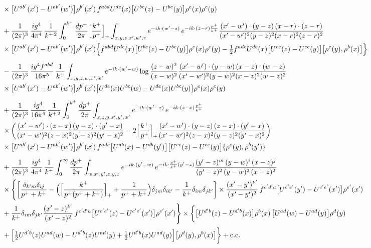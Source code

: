 \documentclass[9pt]{article}
\numberwithin{equation}{section}
\begin{document}
\begin{align}
&\times\big[U^{ab'}(x')-U^{ab'}(w')\big]\rho^{b'}(x')\,f^{abd}U^{de}(x)\big[U^{bc}(z)-U^{bc}(y)\big]\rho^{e}(x)\rho^{c}(y)\notag\\[6pt]
&+\frac{1}{(2\pi)^{3}}\,\frac{ig^{4}}{4\pi^{4}}\,\frac{1}{k^{+\,2}}\int_{0}^{k^{+}}\frac{dp^{+}}{2\pi}\Big[\frac{k^{+}}{p^{+}}\Big]_{+}\int_{x,y,z,x',w',r}e^{-ik\cdot(w'-z)}\,e^{-ik\cdot(z-r)\frac{p^{+}}{k^{+}}}\frac{(x'-w')\cdot(y-z)\,(x-r)\cdot(z-r)}{(x'-w')^{2}(y-z)^{2}(x-r)^{2}(z-r)^{2}}\notag\\
&\times\big[U^{ab'}(x')-U^{ab'}(w')\big]\rho^{b'}(x')\Big\{f^{abd}U^{de}(x)\big[U^{bc}(z)-U^{bc}(y)\big]\rho^{e}(x)\rho^{c}(y)-\tfrac12f^{adc}U^{db}(x)\big[U^{ce}(z)-U^{ce}(y)\big]\big[\rho^{e}(y),\rho^{b}(x)\big]\Big\}\notag\\[6pt]
&-\frac{1}{(2\pi)^{3}}\,\frac{ig^{4}f^{abd}}{16\pi^{5}}\,\frac{1}{k^{+}}\int_{x,y,z,w,x',w'}e^{-ik\cdot(w'-w)}\log\frac{(z-w)^{2}}{(x-w)^{2}}\frac{(x'-w')\cdot(y-w)\,(x-z)\cdot(w-z)}{(x'-w')^{2}(y-w)^{2}(x-z)^{2}(w-z)^{2}}\notag\\
&\times\big[U^{ab'}(x')-U^{ab'}(w')\big]\rho^{b'}(x')\big[U^{de}(x)U^{bc}(w)-U^{de}(x)U^{bc}(y)\big]\rho^{e}(x)\rho^{c}(y)\notag\\[6pt]
&+\frac{1}{(2\pi)^{3}}\,\frac{ig^{4}}{16\pi^{4}}\,\frac{1}{k^{+\,2}}\int_{0}^{k^{+}}\frac{dp^{+}}{2\pi}\int_{x,z,y,x',y',w'}e^{-ik\cdot(w'-z)}\,e^{-ik\cdot(z-x)\frac{p^{+}}{k^{+}}}\notag\\
&\times\bigg(\frac{(x'-w')\cdot(z-x)\,(y-z)\cdot(y'-x)}{(x'-w')^{2}(z-x)^{2}(y-z)^{2}(y'-x)^{2}}-2\Big[\frac{k^{+}}{p^{+}}\Big]_{+}\frac{(x'-w')\cdot(y-z)\,(z-x)\cdot(y'-x)}{(x'-w')^{2}(z-x)^{2}(y-z)^{2}(y'-x)^{2}}\bigg)\notag\\
&\times\big[U^{ab'}(x')-U^{ab'}(w')\big]\rho^{b'}(x')\,f^{adc}\big[U^{db}(x)-U^{db}(y')\big]\big[U^{ce}(z)-U^{ce}(y)\big]\{\rho^{e}(y),\rho^{b}(y')\}\notag\\[6pt]
&+\frac{1}{(2\pi)^{3}}\,\frac{ig^{4}}{4\pi^{4}}\,\frac{1}{k^{+}}\int_{0}^{\infty}\frac{dp^{+}}{2\pi}\int_{w,x',y',z,y,x}e^{-ik\cdot(y'-w)}\,e^{-ik\cdot\frac{p^{+}}{k^{+}}(y'-z)}\frac{(y'-z)^{m}\,(y-w)^{i}\,(x-z)^{j}}{(y'-z)^{2}\,(y-w)^{2}\,(x-z)^{2}}\notag\\
&\times\Bigg\{\bigg[\frac{\delta_{k'm}\delta_{ij}}{p^{+}+k^{+}}-\Big(\Big[\frac{k^{+}}{p^{+}(p^{+}+k^{+})}\Big]_{+}+\frac{1}{p^{+}+k^{+}}\Big)\delta_{jm}\delta_{ik'}-\frac{1}{k^{+}}\delta_{im}\delta_{jk'}\bigg]\times\frac{(x'-y')^{k'}}{(x'-y')^{2}}\,f^{c'd'a}\big[U^{c'e'}(y')-U^{c'e'}(x')\big]\rho^{e'}(x')\notag\\
&+\frac{1}{k^{+}}\delta_{im}\delta_{jk'}\frac{(x'-z)^{k'}}{(x'-z)^{2}}\,f^{c'd'a}\big[U^{c'e'}(z)-U^{c'e'}(x')\big]\rho^{e'}(x')\Bigg\}\times\bigg\{\big[U^{d'b}(z)-U^{d'b}(x)\big]\rho^{b}(x)\,\big[U^{ad}(w)-U^{ad}(y)\big]\rho^{d}(y)\notag\\
&+\Big[\tfrac12U^{d'b}(z)U^{ad}(w)-U^{d'b}(z)U^{ad}(y)+\tfrac12U^{d'b}(x)U^{ad}(y)\Big]\big[\rho^{d}(y),\rho^{b}(x)\big]\bigg\}+{\rm c.c.}
\end{align}
\end{document}
